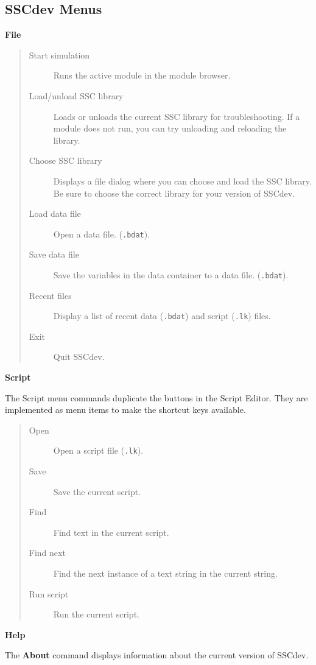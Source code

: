 \documentclass{article}
\begin{document}
\subsection{SSCdev Menus}
\label{sec_menus}

\textbf{File}
\begin{quote}
\begin{description}
\item[Start simulation] Runs the active module in the module browser.
\item[Load/unload SSC library] Loads or unloads the current SSC library for troubleshooting. If a module does not run, you can try unloading and reloading the library.
\item[Choose SSC library] Displays a file dialog where you can choose and load the SSC library. Be sure to choose the correct library for your version of SSCdev.
\item[Load data file] Open a data file. (\texttt{.bdat}).
\item[Save data file] Save the variables in the data container to a data file. (\texttt{.bdat}).
\item[Recent files] Display a list of recent data (\texttt{.bdat}) and script (\texttt{.lk}) files.
\item[Exit] Quit SSCdev.
\end{description}
\end{quote}

\textbf{Script}

The Script menu commands duplicate the buttons in the Script Editor. They are implemented as menu items to make the shortcut keys available.

\begin{quote}
\begin{description}
\item[Open] Open a script file (\texttt{.lk}).
\item[Save] Save the current script.
\item[Find] Find text in the current script.
\item[Find next] Find the next instance of a text string in the current string.
\item[Run script] Run the current script. 
\end{description}
\end{quote}

\textbf{Help}

The \textbf{About} command displays information about the current version of SSCdev.
\end{document}
